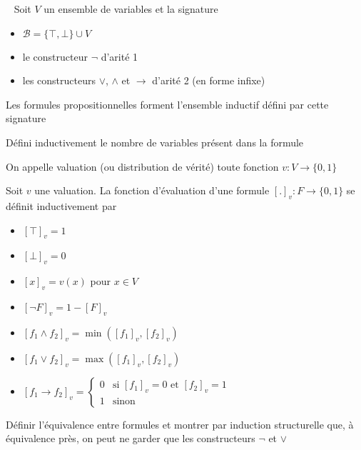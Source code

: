 \begin{definition}~
	Soit $V$ un ensemble de variables et la signature \begin{itemize}
		\item $\mathcal B = \{ \top, \bot\} \cup V$
		\item le constructeur $\neg$ d'arité 1
		\item les constructeurs $\vee$, $\wedge$ et $\to$ d'arité 2 (en forme infixe)
	\end{itemize}
	Les formules propositionnelles forment l'ensemble inductif défini par cette signature
\end{definition}

\begin{exercise}
	Défini inductivement le nombre de variables présent dans la formule
\end{exercise}

\begin{definition}
	On appelle valuation (ou distribution de vérité) toute fonction $v : V \to \{0, 1\}$
\end{definition}

\begin{definition} Soit $v$ une valuation. La fonction d'évaluation d'une formule $[.]_v : F \to \{0,1\}$ se définit inductivement par \begin{itemize}[label=$\bullet$]
		\item $[\top]_v = 1$
		\item $[\bot]_v = 0$
		\item $[x]_v = v(x)$ pour $x \in V$
		\item $[\neg F]_v = 1 - [F]_v$
		\item $[f_1 \wedge f_2]_v = \min([f_1]_v, [f_2]_v)$
		\item $[f_1 \vee f_2]_v = \max([f_1]_v, [f_2]_v)$
		\item $[f_1 \to f_2]_v = \left\{ \begin{array}{ll}
			0 & \text{si } [f_1]_v = 0 \text{ et } [f_2]_v = 1\\
			1 & \text{sinon}
		\end{array} \right.$
\end{itemize}
\end{definition}

\begin{exercise}
	Définir l'équivalence entre formules et montrer par induction structurelle que, à équivalence près, on peut ne garder que les constructeurs $\neg$ et $\vee$
\end{exercise}

